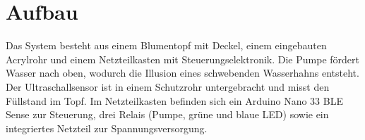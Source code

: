 %
%
%

\section{Aufbau}
Das System besteht aus einem Blumentopf mit Deckel, einem eingebauten Acrylrohr und einem Netzteilkasten mit Steuerungselektronik. Die Pumpe fördert Wasser nach oben, wodurch die Illusion eines schwebenden Wasserhahns entsteht. Der Ultraschallsensor ist in einem Schutzrohr untergebracht und misst den Füllstand im Topf. Im Netzteilkasten befinden sich ein Arduino Nano 33 BLE Sense zur Steuerung, drei Relais (Pumpe, grüne und blaue LED) sowie ein integriertes Netzteil zur Spannungsversorgung.
